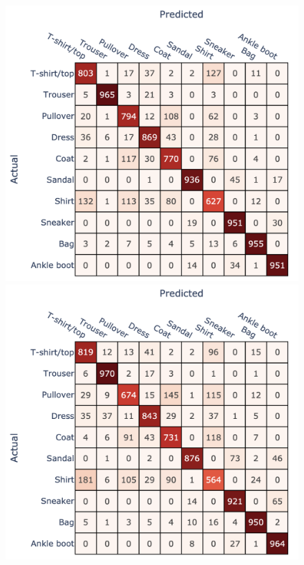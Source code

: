 \begin{figure}[!htb]
    \begin{minipage}{0.33\textwidth}
      \centering
      \includegraphics[width=1\linewidth]{images/CM_FullySupervised_SVC.png}
    \end{minipage}\hfill
    \begin{minipage}{0.33\textwidth}
      \centering
      \includegraphics[width=1\linewidth]{images/CM_FullySupervised_FCNN.png}

\end{minipage}
\end{figure}

